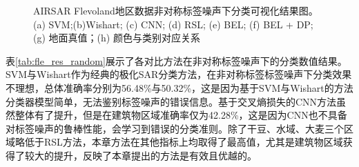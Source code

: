 \begin{figure}[ht!]

  \caption{AIRSAR Flevoland地区数据非对称标签噪声下分类可视化结果图。(a) SVM;(b)Wishart; (c) CNN; (d) RSL; (e) BEL; (f) BEL + DP; (g) 地面真值；(h) 颜色与类别对应关系}
  \label{fig:fle_random}
\end{figure}


表\ref{tab:fle_res_random}展示了各对比方法在非对称标签噪声下的分类数值结果。SVM与Wishart作为经典的极化SAR分类方法，在非对称标签标签噪声下分类效果不理想，总体准确率分别为56.48\%与50.32\%，这是因为基于SVM与Wishart的方法分类器模型简单，无法鉴别标签噪声的错误信息。基于交叉熵损失的CNN方法虽然整体有了提升，但是在建筑物区域准确率仅为42.28\%，这是因为CNN也不具备对标签噪声的鲁棒性能，会学习到错误的分类准则。除了干豆、水域、大麦三个区域略低于RSL方法，本章方法在其他指标上均取得了最高值，尤其是建筑物区域获得了较大的提升，反映了本章提出的方法是有效且优越的。

